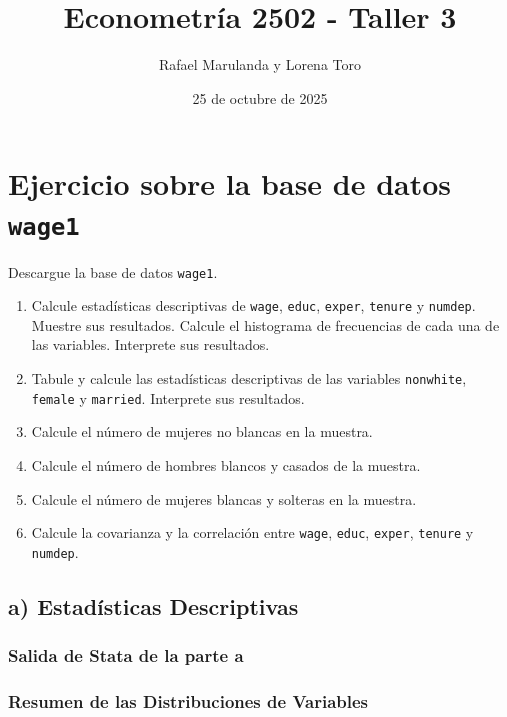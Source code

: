 \documentclass[12pt]{article}
\title{Econometría 2502 - Taller 3}
\author{Rafael Marulanda y Lorena Toro}
\date{25 de octubre de 2025}
\begin{document}
\maketitle

\section{Ejercicio sobre la base de datos \texttt{wage1}}

Descargue la base de datos \texttt{wage1}.

\begin{enumerate}[label=\alph*)]
    \item Calcule estadísticas descriptivas de \texttt{wage}, \texttt{educ}, \texttt{exper}, \texttt{tenure} y \texttt{numdep}. Muestre sus resultados. Calcule el histograma de frecuencias de cada una de las variables. Interprete sus resultados.
    
    \item Tabule y calcule las estadísticas descriptivas de las variables \texttt{nonwhite}, \texttt{female} y \texttt{married}. Interprete sus resultados.
    
    \item Calcule el número de mujeres no blancas en la muestra.
    
    \item Calcule el número de hombres blancos y casados de la muestra.
    
    \item Calcule el número de mujeres blancas y solteras en la muestra.
    
    \item Calcule la covarianza y la correlación entre \texttt{wage}, \texttt{educ}, \texttt{exper}, \texttt{tenure} y \texttt{numdep}.
\end{enumerate}

\subsection*{a) Estadísticas Descriptivas}

\subsubsection*{Salida de Stata de la parte a}



\subsubsection*{Resumen de las Distribuciones de Variables}
\end{document}
